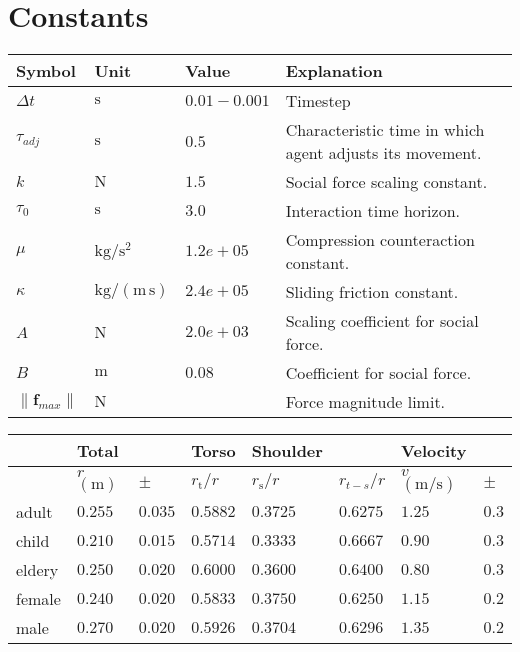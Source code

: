 \section{Constants}


\begin{tabular*}{1.0\linewidth}{llll}
Symbol         & Unit & Value & Explanation \\
\hline
\hline
$ \Delta t $ & $ \mathrm{s} $ & $ 0.01-0.001 $ & Timestep \\
\hline
\hline
$ \tau_{adj} $ & $ \mathrm{s} $ & $ 0.5 $ & Characteristic time in which agent adjusts its movement. \\
$ k $          & $ \mathrm{N} $ & $ 1.5 $ & Social force scaling constant. \\
$ \tau_{0} $   & $ \mathrm{s} $ & $ 3.0 $ & Interaction time horizon. \\
$ \mu $        & $ \mathrm{kg / s^{2}} $ & $ 1.2e+05 $ & Compression counteraction constant. \\
$ \kappa $     & $ \mathrm{kg / (m\,s)} $ & $ 2.4e+05 $ & Sliding friction constant. \\
$ A $          & $ \mathrm{N} $ & $ 2.0e+03 $ & Scaling coefficient for social force. \\
$ B $          & $ \mathrm{m} $ & $ 0.08 $ & Coefficient for social force. \\
\hline
\hline
$ \left\|\mathbf{f}_{max}\right\| $    & $ \mathrm{N} $ &  & Force magnitude limit. \\
\hline
\end{tabular*} 


\begin{tabular*}{1.0\linewidth}{llllllll}
& Total && Torso & Shoulder &  & Velocity &  \\
\hline
& $ r $ $ (\mathrm{m}) $ & $ \pm $ & $ r_{\text{t}} / r $ & $ r_{\text{s}} / r $ & $ r_{t-s} / r $ & $ v $ $ (\mathrm{m} / \mathrm{s}) $ & $ \pm $ \\
\hline\hline
adult & $ 0.255 $ & $ 0.035 $ & $ 0.5882 $ & $ 0.3725 $ & $ 0.6275 $ & $ 1.25 $ & $ 0.3 $ \\
child & $ 0.210 $ & $ 0.015 $ & $ 0.5714 $ & $ 0.3333 $ & $ 0.6667 $ & $ 0.90 $ & $ 0.3 $ \\
eldery & $ 0.250 $ & $ 0.020 $ & $ 0.6000 $ & $ 0.3600 $ & $ 0.6400 $ & $ 0.80 $ & $ 0.3 $ \\
female & $ 0.240 $ & $ 0.020 $ & $ 0.5833 $ & $ 0.3750 $ & $ 0.6250 $ & $ 1.15 $ & $ 0.2 $ \\
male & $ 0.270 $ & $ 0.020 $ & $ 0.5926 $ & $ 0.3704 $ & $ 0.6296 $ & $ 1.35 $ & $ 0.2 $ \\
\hline
\end{tabular*} 
